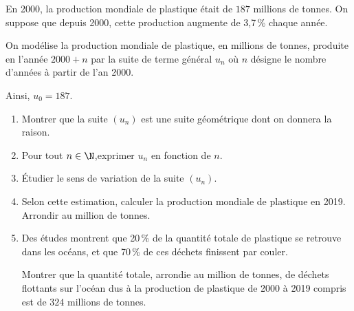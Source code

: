 \medskip

En 2000, la production mondiale de plastique était de $187$ millions de tonnes. On suppose que depuis 2000, cette production augmente de 3,7\,\% chaque année.

On modélise la production mondiale de plastique, en millions de tonnes, produite en l'année $2000 + n$ par la suite de terme général $u_n$ où $n$ désigne le nombre d'années à partir de l'an 2000. 

Ainsi, $u_0 = 187$.

\medskip

\begin{enumerate}
\item Montrer que la suite $\left(u_n\right)$ est une suite géométrique dont on donnera la raison.
\item Pour tout $n \in \N$,exprimer $u_n$ en fonction de $n$.
\item Étudier le sens de variation de la suite $\left(u_n\right)$.
\item  Selon cette estimation, calculer la production mondiale de plastique en 2019. Arrondir au million de tonnes.
\item Des études montrent que 20\,\% de la quantité totale de plastique se retrouve dans les océans, et que 70\,\% de ces déchets finissent par couler.

Montrer que la quantité totale, arrondie au million de tonnes, de déchets flottants sur l'océan dus à la production de plastique de 2000 à 2019 compris est de $324$ millions de tonnes.
\end{enumerate}

\bigskip
